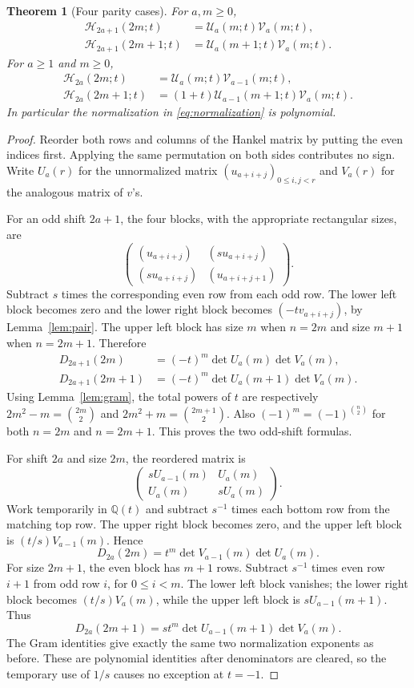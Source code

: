 \documentclass[11pt]{article}
\newtheorem{theorem}{Theorem}[section]
\theoremstyle{definition}
\theoremstyle{remark}
\newcommand{\Q}{\mathbb Q}
\newcommand{\U}{\mathcal U}
\newcommand{\V}{\mathcal V}
\newcommand{\Ht}{\mathcal H}
\numberwithin{equation}{section}
\begin{document}
\begin{theorem}[Four parity cases]
\label{thm:factor}
For $a,m\ge0$,
\begin{align}
 \Ht_{2a+1}(2m;t)&=\U_a(m;t)\V_a(m;t),\label{eq:factor-oo}\\
 \Ht_{2a+1}(2m+1;t)&=\U_a(m+1;t)\V_a(m;t).\label{eq:factor-oe}
\end{align}
For $a\ge1$ and $m\ge0$,
\begin{align}
 \Ht_{2a}(2m;t)&=\U_a(m;t)\V_{a-1}(m;t),\label{eq:factor-eo}\\
 \Ht_{2a}(2m+1;t)&=(1+t)\U_{a-1}(m+1;t)\V_a(m;t).\label{eq:factor-ee}
\end{align}
In particular the normalization in \eqref{eq:normalization} is polynomial.
\end{theorem}
\begin{proof}
Reorder both rows and columns of the Hankel matrix by putting the even
indices first. Applying the same permutation on both sides contributes no
sign. Write $U_a(r)$ for the unnormalized matrix
$(u_{a+i+j})_{0\le i,j<r}$ and $V_a(r)$ for the analogous matrix of $v$'s.

For an odd shift $2a+1$, the four blocks, with the appropriate rectangular
sizes, are
\[
 \begin{pmatrix}
 (u_{a+i+j})& (s u_{a+i+j})\\
 (s u_{a+i+j})& (u_{a+i+j+1})
 \end{pmatrix}.
\]
Subtract $s$ times the corresponding even row from each odd row. The lower
left block becomes zero and the lower right block becomes
$(-t v_{a+i+j})$, by Lemma~\ref{lem:pair}. The upper left block has size
$m$ when $n=2m$ and size $m+1$ when $n=2m+1$. Therefore
\begin{align*}
 D_{2a+1}(2m)&=(-t)^m\det U_a(m)\det V_a(m),\\
 D_{2a+1}(2m+1)&=(-t)^m\det U_a(m+1)\det V_a(m).
\end{align*}
Using Lemma~\ref{lem:gram}, the total powers of $t$ are respectively
$2m^2-m=\binom{2m}{2}$ and $2m^2+m=\binom{2m+1}{2}$.
Also $(-1)^m=(-1)^{\binom n2}$ for both $n=2m$ and $n=2m+1$.
This proves the two odd-shift formulas.

For shift $2a$ and size $2m$, the reordered matrix is
\[
 \begin{pmatrix}sU_{a-1}(m)&U_a(m)\\ U_a(m)&sU_a(m)\end{pmatrix}.
\]
Work temporarily in $\Q(t)$ and subtract $s^{-1}$ times each bottom row
from the matching top row. The upper right block becomes zero, and the
upper left block is $(t/s)V_{a-1}(m)$. Hence
\[
 D_{2a}(2m)=t^m\det V_{a-1}(m)\det U_a(m).
\]
For size $2m+1$, the even block has $m+1$ rows. Subtract $s^{-1}$ times
even row $i+1$ from odd row $i$, for $0\le i<m$. The lower left block
vanishes; the lower right block becomes $(t/s)V_a(m)$, while the upper
left block is $sU_{a-1}(m+1)$. Thus
\[
 D_{2a}(2m+1)=s t^m\det U_{a-1}(m+1)\det V_a(m).
\]
The Gram identities give exactly the same two normalization exponents as
before. These are polynomial identities after denominators are cleared,
so the temporary use of $1/s$ causes no exception at $t=-1$.
\end{proof}
\end{document}
